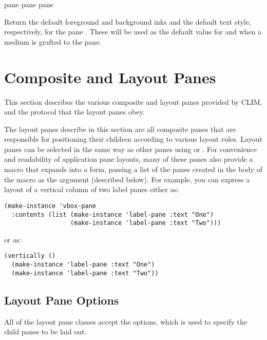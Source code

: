  {pane}
 {pane}
 {pane}

Return the default foreground and background inks and the default text style,
respectively, for the pane .  These will be used as the default value
for  and  when a medium is grafted
to the pane.


\section {Composite and Layout Panes}

This section describes the various composite and layout panes provided by CLIM,
and the protocol that the layout panes obey.

The layout panes describe in this section are all composite panes that are
responsible for positioning their children according to various layout rules.
Layout panes can be selected in the same way as other panes using 
or .  For convenience and readability of application pane
layouts, many of these panes also provide a macro that expands into a
 form, passing a list of the panes created in the body of the
macro as the  argument (described below).  For example, you can
express a layout of a vertical column of two label panes either as:

\begin{verbatim}
(make-instance 'vbox-pane
  :contents (list (make-instance 'label-pane :text "One")
                  (make-instance 'label-pane :text "Two")))
\end{verbatim}

or as:

\begin{verbatim}
(vertically ()
  (make-instance 'label-pane :text "One")
  (make-instance 'label-pane :text "Two"))
\end{verbatim}


\subsection {Layout Pane Options}


All of the layout pane classes accept the  options, which is used
to specify the child panes to be laid out.


